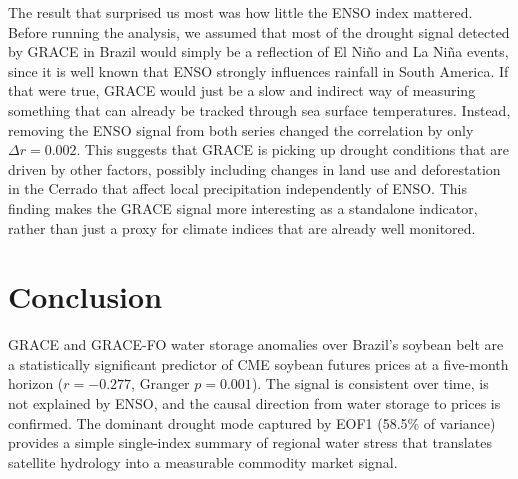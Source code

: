 \documentclass[6pt, twocolumn]{article}
\begin{document}
The result that surprised us most was how little the ENSO index
mattered. Before running the analysis, we assumed that most of the
drought signal detected by GRACE in Brazil would simply be a
reflection of El Niño and La Niña events, since it is well known
that ENSO strongly influences rainfall in South America. If that
were true, GRACE would just be a slow and indirect way of measuring
something that can already be tracked through sea surface
temperatures. Instead, removing the ENSO signal from both series
changed the correlation by only $\Delta r = 0.002$. This suggests
that GRACE is picking up drought conditions that are driven by
other factors, possibly including changes in land use and
deforestation in the Cerrado that affect local precipitation
independently of ENSO. This finding makes the GRACE signal more
interesting as a standalone indicator, rather than just a proxy
for climate indices that are already well monitored.

\FloatBarrier
\section*{Conclusion}

GRACE and GRACE-FO water storage anomalies over Brazil's soybean
belt are a statistically significant predictor of CME soybean
futures prices at a five-month horizon ($r = -0.277$,
Granger $p = 0.001$). The signal is consistent over time, is not
explained by ENSO, and the causal direction from water storage to
prices is confirmed. The dominant drought mode captured by EOF1
(58.5\% of variance) provides a simple single-index summary of
regional water stress that translates satellite hydrology into
a measurable commodity market signal.

\nocite{*}
\printbibliography[heading=bibintoc, title={References}]
\end{document}
